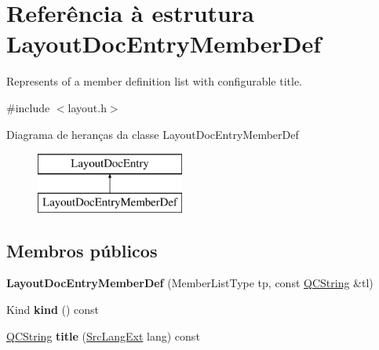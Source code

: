 \hypertarget{struct_layout_doc_entry_member_def}{\section{Referência à estrutura Layout\-Doc\-Entry\-Member\-Def}
\label{struct_layout_doc_entry_member_def}
}


Represents of a member definition list with configurable title.  




{\ttfamily \#include $<$layout.\-h$>$}

Diagrama de heranças da classe Layout\-Doc\-Entry\-Member\-Def\begin{figure}[H]
\begin{center}
\leavevmode
\includegraphics[height=2.000000cm]{struct_layout_doc_entry_member_def}
\end{center}
\end{figure}
\subsection*{Membros públicos}
\begin{DoxyCompactItemize}
\item 
\hypertarget{struct_layout_doc_entry_member_def_a36e27fe9b08d70d9d335c3853d15b2f0}{{\bfseries Layout\-Doc\-Entry\-Member\-Def} (Member\-List\-Type tp, const \hyperlink{class_q_c_string}{Q\-C\-String} \&tl)}\label{struct_layout_doc_entry_member_def_a36e27fe9b08d70d9d335c3853d15b2f0}

\item 
\hypertarget{struct_layout_doc_entry_member_def_aa9d037bed9f9a083d0cd01485637d843}{Kind {\bfseries kind} () const }\label{struct_layout_doc_entry_member_def_aa9d037bed9f9a083d0cd01485637d843}

\item 
\hypertarget{struct_layout_doc_entry_member_def_a14d417557eb866a95f7bd071619d8ed9}{\hyperlink{class_q_c_string}{Q\-C\-String} {\bfseries title} (\hyperlink{types_8h_a9974623ce72fc23df5d64426b9178bf2}{Src\-Lang\-Ext} lang) const }\label{struct_layout_doc_entry_member_def_a14d417557eb866a95f7bd071619d8ed9}

\end{DoxyCompactItemize}
